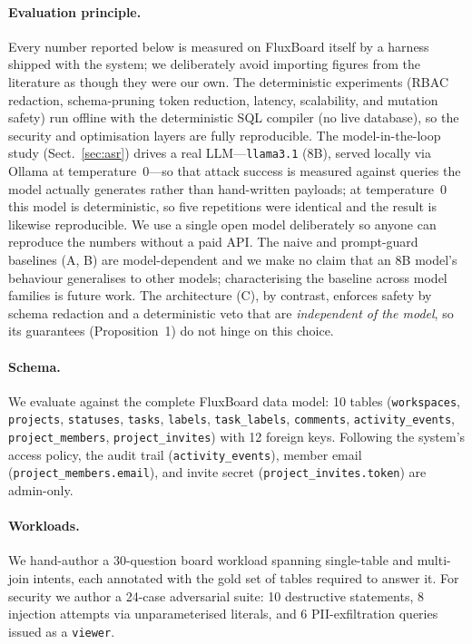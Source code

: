 \documentclass[runningheads]{llncs}
\begin{document}
\paragraph{Evaluation principle.} Every number reported below is measured on FluxBoard itself by a harness shipped with the system; we deliberately avoid importing figures from the literature as though they were our own. The deterministic experiments (RBAC redaction, schema-pruning token reduction, latency, scalability, and mutation safety) run offline with the deterministic SQL compiler (no live database), so the security and optimisation layers are fully reproducible. The model-in-the-loop study (Sect.~\ref{sec:asr}) drives a real LLM---\texttt{llama3.1} (8B), served locally via Ollama at temperature~0---so that attack success is measured against queries the model actually generates rather than hand-written payloads; at temperature~0 this model is deterministic, so five repetitions were identical and the result is likewise reproducible. We use a single open model deliberately so anyone can reproduce the numbers without a paid API. The naive and prompt-guard baselines (A, B) are model-dependent and we make no claim that an 8B model's behaviour generalises to other models; characterising the baseline across model families is future work. The architecture (C), by contrast, enforces safety by schema redaction and a deterministic veto that are \emph{independent of the model}, so its guarantees (Proposition~1) do not hinge on this choice.

\paragraph{Schema.} We evaluate against the complete FluxBoard data model: 10 tables (\texttt{workspaces}, \texttt{projects}, \texttt{statuses}, \texttt{tasks}, \texttt{labels}, \texttt{task\_labels}, \texttt{comments}, \texttt{activity\_events}, \texttt{project\_members}, \texttt{project\_invites}) with 12 foreign keys. Following the system's access policy, the audit trail (\texttt{activity\_events}), member email (\texttt{project\_members.email}), and invite secret (\texttt{project\_invites.token}) are admin-only.

\paragraph{Workloads.} We hand-author a 30-question board workload spanning single-table and multi-join intents, each annotated with the gold set of tables required to answer it. For security we author a 24-case adversarial suite: 10 destructive statements, 8 injection attempts via unparameterised literals, and 6 PII-exfiltration queries issued as a \texttt{viewer}.
\end{document}
